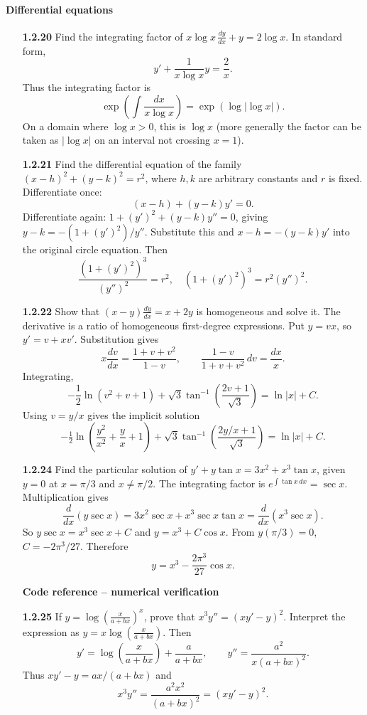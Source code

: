 \paragraph*{Differential equations}
\begin{enumerate}[label={},leftmargin=0pt,itemsep=9pt]
\item[\textbf{1.2.20}] Find the integrating factor of $x\log x\,\frac{dy}{dx}+y=2\log x$.
\solution In standard form,
\[
y'+\frac{1}{x\log x}y=\frac2x.
\]
Thus the integrating factor is
\[
\exp\!\left(\int\frac{dx}{x\log x}\right)=\exp(\log|\log x|).
\]
On a domain where $\log x>0$, this is $\log x$ (more generally the factor can be taken as $|\log x|$ on an interval not crossing $x=1$).

\item[\textbf{1.2.21}] Find the differential equation of the family $(x-h)^2+(y-k)^2=r^2$, where $h,k$ are arbitrary constants and $r$ is fixed.
\solution Differentiate once:
\[
(x-h)+(y-k)y'=0.
\]
Differentiate again: $1+(y')^2+(y-k)y''=0$, giving $y-k=-(1+(y')^2)/y''$. Substitute this and $x-h=-(y-k)y'$ into the original circle equation. Then
\[
\frac{(1+(y')^2)^3}{(y'')^2}=r^2,
\quad(1+(y')^2)^3=r^2(y'')^2.
\]

\item[\textbf{1.2.22}] Show that $(x-y)\frac{dy}{dx}=x+2y$ is homogeneous and solve it.
\solution The derivative is a ratio of homogeneous first-degree expressions. Put $y=vx$, so $y'=v+xv'$. Substitution gives
\[
x\frac{dv}{dx}=\frac{1+v+v^2}{1-v},\qquad
\frac{1-v}{1+v+v^2}\,dv=\frac{dx}{x}.
\]
Integrating,
\[
-\frac12\ln(v^2+v+1)+\sqrt3\tan^{-1}\!\left(\frac{2v+1}{\sqrt3}\right)=\ln|x|+C.
\]
Using $v=y/x$ gives the implicit solution
\[
-\tfrac12\ln\!\left(\frac{y^2}{x^2}+\frac yx+1\right)+\sqrt3\tan^{-1}\!\left(\frac{2y/x+1}{\sqrt3}\right)=\ln|x|+C.
\]

\item[\textbf{1.2.24}] Find the particular solution of $y'+y\tan x=3x^2+x^3\tan x$, given $y=0$ at $x=\pi/3$ and $x\ne\pi/2$.
\solution The integrating factor is $e^{\int\tan x\,dx}=\sec x$. Multiplication gives
\[
\frac{d}{dx}(y\sec x)=3x^2\sec x+x^3\sec x\tan x=\frac{d}{dx}(x^3\sec x).
\]
So $y\sec x=x^3\sec x+C$ and $y=x^3+C\cos x$. From $y(\pi/3)=0$, $C=-2\pi^3/27$. Therefore
\[
y=x^3-\frac{2\pi^3}{27}\cos x.
\]
\par\smallskip
\noindent\textbf{Code reference -- numerical verification}
\par\noindent{}
\par\smallskip

\item[\textbf{1.2.25}] If $y=\log\left(\frac{x}{a+bx}\right)^x$, prove that $x^3y''=(xy'-y)^2$.
\solution Interpret the expression as $y=x\log\left(\frac{x}{a+bx}\right)$. Then
\[
y'=\log\left(\frac{x}{a+bx}\right)+\frac{a}{a+bx},\qquad
 y''=\frac{a^2}{x(a+bx)^2}.
\]
Thus $xy'-y=ax/(a+bx)$ and
\[
x^3y''=\frac{a^2x^2}{(a+bx)^2}=(xy'-y)^2.
\]
\end{enumerate}



